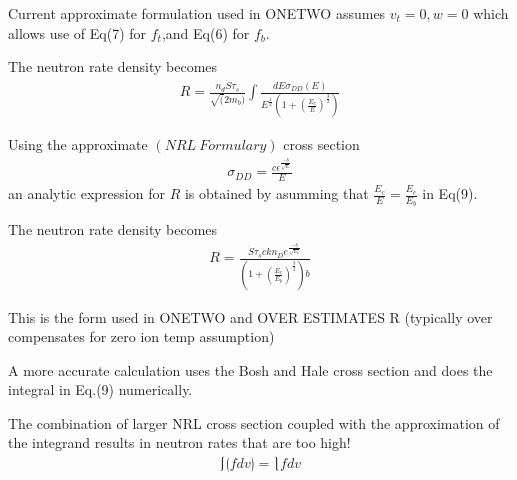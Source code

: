 \documentclass{slides}
\newcommand{\beq}{\begin{eqnarray}}
\newcommand{\eeq}{\end{eqnarray}}
\begin{document}
           Current approximate formulation used in ONETWO assumes $v_t=0,
		w=0$ which allows use of Eq(7) for $f_t$,and Eq(6) for $f_b$.

                The neutron rate density becomes
                 \beq
                         R=\frac{n_d \dot S \tau_s}{\sqrt(2m_b)}
                           \int\frac{dE\sigma_{DD}(E)}{E^{\frac{1}{2}}
                           (1+{(\frac{E_c}{E})}^{\frac{3}{2}})}
                 \eeq
                
               Using the approximate $\left( NRL\  Formulary \right)  $ 
               cross section
               \beq
                   \sigma_{DD} =\frac{ c
                    \epsilon^{\frac{-b}{\sqrt{E}}}}{E}
                \eeq
	       an analytic expression for $R$ is obtained
               by asumming that $\frac{E_c}{E}=\frac{E_c}{E_b}$ in
	       Eq(9). 
             

               The neutron rate density becomes
         \beq
            R=\frac{ \dot S \tau_s c k n_D e^{\frac{-b}{\sqrt{E_b}}}}
          {  (1+\left({\frac{E_c}{E_b}}\right)
                     ^{\frac{3}{2}})b}
         \eeq

	 This is the form used in ONETWO and OVER ESTIMATES R 
         (typically over compensates for zero ion temp assumption)

	A more accurate calculation uses the Bosh and Hale
        cross section and does the integral in Eq.(9)  numerically.
    
        The combination of larger NRL cross section coupled
        with the approximation of the integrand results in
        neutron rates that are too high!
    \beq
         \lmoustache\lgroup fdv \rgroup = \rmoustache fdv
    \eeq
    
\end{document}
